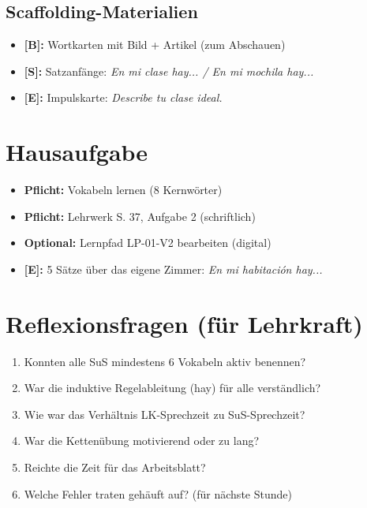 \documentclass[11pt,a4paper]{article}
\begin{document}
\subsection{Scaffolding-Materialien}

\begin{itemize}
    \item \textbf{[B]:} Wortkarten mit Bild + Artikel (zum Abschauen)
    \item \textbf{[S]:} Satzanfänge: \textit{En mi clase hay... / En mi mochila hay...}
    \item \textbf{[E]:} Impulskarte: \textit{Describe tu clase ideal.}
\end{itemize}

\section{Hausaufgabe}

\begin{itemize}
    \item \textbf{Pflicht:} Vokabeln lernen (8 Kernwörter)
    \item \textbf{Pflicht:} Lehrwerk S. 37, Aufgabe 2 (schriftlich)
    \item \textbf{Optional:} Lernpfad LP-01-V2 bearbeiten (digital)
    \item \textbf{[E]:} 5 Sätze über das eigene Zimmer: \textit{En mi habitación hay...}
\end{itemize}

\section{Reflexionsfragen (für Lehrkraft)}

\begin{enumerate}
    \item Konnten alle SuS mindestens 6 Vokabeln aktiv benennen?
    \item War die induktive Regelableitung (hay) für alle verständlich?
    \item Wie war das Verhältnis LK-Sprechzeit zu SuS-Sprechzeit?
    \item War die Kettenübung motivierend oder zu lang?
    \item Reichte die Zeit für das Arbeitsblatt?
    \item Welche Fehler traten gehäuft auf? (für nächste Stunde)
\end{enumerate}
\end{document}
